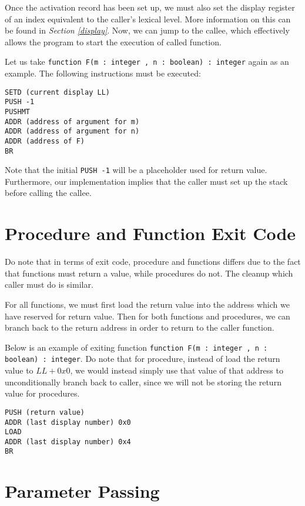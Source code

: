 \documentclass{article}
\begin{document}
Once the activation record has been set up, we must also set the display register of an index equivalent to the caller's lexical level. More information on this can be found in {\it Section \ref{display}}. Now, we can jump to the callee, which effectively allows the program to start the execution of called function.

Let us take {\tt function F(m : integer , n : boolean) : integer} again as an example. The following instructions must be executed:

\begin{lstlisting}
SETD (current display LL)
PUSH -1
PUSHMT
ADDR (address of argument for m)
ADDR (address of argument for n)
ADDR (address of F)
BR
\end{lstlisting}

Note that the initial {\tt PUSH -1} will be a placeholder used for return value. Furthermore, our implementation implies that the caller must set up the stack before calling the callee.

\section{Procedure and Function Exit Code}

Do note that in terms of exit code, procedure and functions differs due to the fact that functions must return a value, while procedures do not. The cleanup which caller must do is similar.

For all functions, we must first load the return value into the address which we have reserved for return value. Then for both functions and procedures, we can branch back to the return address in order to return to the caller function.

Below is an example of exiting function {\tt function F(m : integer , n : boolean) : integer}. Do note that for procedure, instead of load the return value to $LL + 0x0$, we would instead simply use that value of that address to unconditionally branch back to caller, since we will not be storing the return value for procedures.

\begin{lstlisting}
PUSH (return value)
ADDR (last display number) 0x0
LOAD
ADDR (last display number) 0x4
BR
\end{lstlisting}

\section{Parameter Passing}
\end{document}
